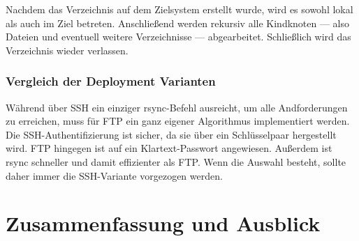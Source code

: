 Nachdem das Verzeichnis auf dem Zielsystem erstellt wurde, wird es sowohl lokal als auch im Ziel betreten. Anschließend werden rekursiv alle Kindknoten — also Dateien und eventuell weitere Verzeichnisse — abgearbeitet. Schließlich wird das Verzeichnis wieder verlassen.


\subsubsection{Vergleich der Deployment Varianten} %
\label{ssub:vergleich_der_deployment_varianten}

Während über SSH ein einziger rsync-Befehl ausreicht, um alle Andforderungen zu erreichen, muss für FTP ein ganz eigener Algorithmus implementiert werden. Die SSH-Authentifizierung ist sicher, da sie über ein Schlüsselpaar hergestellt wird. FTP hingegen ist auf ein Klartext-Passwort angewiesen. Außerdem ist rsync schneller und damit effizienter als FTP. Wenn die Auswahl besteht, sollte daher immer die SSH-Variante vorgezogen werden.




\section{Zusammenfassung und Ausblick} %
\label{sec:zusammenfassung_und_ausblick}
